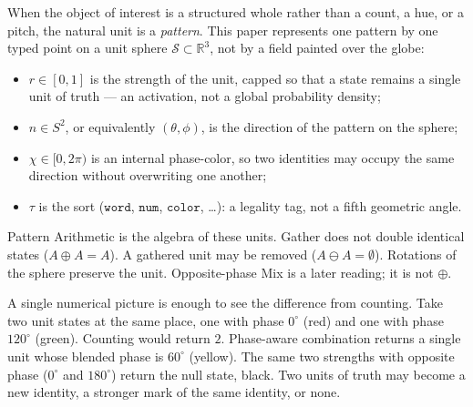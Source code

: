\documentclass[12pt, a4paper]{article}
\begin{document}
When the object of interest is a structured whole rather than a
count, a hue, or a pitch, the natural unit is a \emph{pattern}.
This paper represents one pattern by one typed point on a unit
sphere $\mathcal{S} \subset \mathbb{R}^3$, not by a field painted over the globe:
\begin{itemize}
    \item $r \in [0, 1]$ is the strength of the unit, capped so that a state remains a single unit of truth --- an activation, not a global probability density;
    \item $\hat n \in S^2$, or equivalently $(\theta, \phi)$, is the direction of the pattern on the sphere;
    \item $\chi \in [0, 2\pi)$ is an internal phase-color, so two identities may occupy the same direction without overwriting one another;
    \item $\tau$ is the sort ($\mathtt{word}$, $\mathtt{num}$, $\mathtt{color}$, \ldots): a legality tag, not a fifth geometric angle.
\end{itemize}
Pattern Arithmetic is the algebra of these units. Gather does not double identical states ($A \oplus A = A$). A gathered unit may be removed ($A \ominus A = \emptyset$). Rotations of the sphere preserve the unit. Opposite-phase Mix is a later reading; it is not $\oplus$.

A single numerical picture is enough to see the difference from counting. Take two unit states at the same place, one with phase $0^\circ$ (red) and one with phase $120^\circ$ (green). Counting would return $2$. Phase-aware combination returns a single unit whose blended phase is $60^\circ$ (yellow). The same two strengths with opposite phase ($0^\circ$ and $180^\circ$) return the null state, black. Two units of truth may become a new identity, a stronger mark of the same identity, or none.
\end{document}
